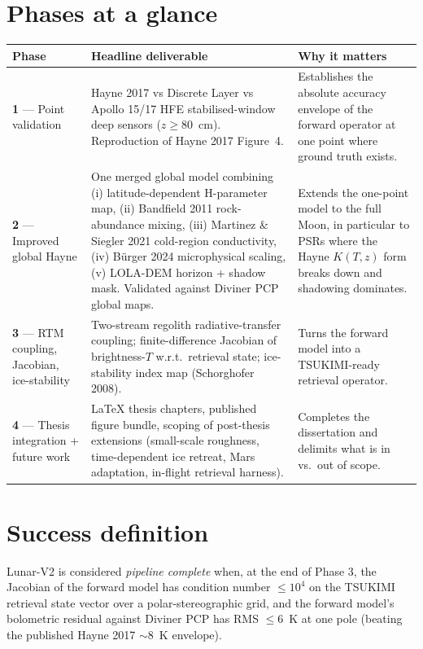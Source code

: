 \documentclass[11pt,a4paper]{book}
\begin{document}
\section{Phases at a glance}
\begin{longtable}{p{} p{} p{}}
\toprule
\textbf{Phase} & \textbf{Headline deliverable} & \textbf{Why it matters} \\
\midrule
\textbf{1} --- Point validation & Hayne 2017 vs Discrete Layer vs Apollo 15/17 HFE stabilised-window deep sensors ($z\!\ge\!80$~cm). Reproduction of Hayne 2017 Figure~4. & Establishes the absolute accuracy envelope of the forward operator at one point where ground truth exists. \\
\textbf{2} --- Improved global Hayne & One merged global model combining (i) latitude-dependent H-parameter map, (ii) Bandfield 2011 rock-abundance mixing, (iii) Martinez \& Siegler 2021 cold-region conductivity, (iv) B\"urger 2024 microphysical scaling, (v) LOLA-DEM horizon + shadow mask. Validated against Diviner PCP global maps. & Extends the one-point model to the full Moon, in particular to PSRs where the Hayne $K(T,z)$ form breaks down and shadowing dominates. \\
\textbf{3} --- RTM coupling, Jacobian, ice-stability & Two-stream regolith radiative-transfer coupling; finite-difference Jacobian of brightness-$T$ w.r.t.~retrieval state; ice-stability index map (Schorghofer 2008). & Turns the forward model into a TSUKIMI-ready retrieval operator. \\
\textbf{4} --- Thesis integration + future work & LaTeX thesis chapters, published figure bundle, scoping of post-thesis extensions (small-scale roughness, time-dependent ice retreat, Mars adaptation, in-flight retrieval harness). & Completes the dissertation and delimits what is in vs.\ out of scope. \\
\bottomrule
\end{longtable}

\section{Success definition}
Lunar-V2 is considered \emph{pipeline complete} when, at the end of
Phase 3, the Jacobian of the forward model has condition number
$\le 10^{4}$ on the TSUKIMI retrieval state vector over a
polar-stereographic grid, and the forward model's bolometric residual
against Diviner PCP has RMS $\le 6$~K at one pole (beating the
published Hayne 2017 $\sim 8$~K envelope).
\end{document}

